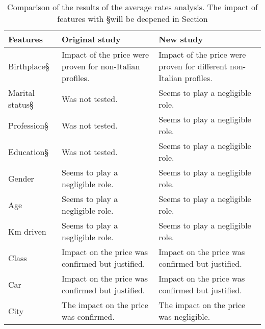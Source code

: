 \begin{table}[!h]
\caption{Comparison of the results of the average rates analysis. The impact of features with \S will be deepened in Section }
\label{tab_average-comparison}
\begin{tabular}{|l|p{6cm}|p{6cm}|}
\hline
\textbf{Features} & \textbf{Original study} & \textbf{New study} \\ \hline
Birthplace\S & Impact of the price were proven for non-Italian profiles. & Impact of the price were proven for different non-Italian profiles. \\ \hline
Marital status\S & Was not tested. & Seems to play a negligible role. \\ \hline
Profession\S & Was not tested. & Seems to play a negligible role. \\ \hline
Education\S & Was not tested. & Seems to play a negligible role. \\ \hline
Gender & Seems to play a negligible role. & Seems to play a negligible role. \\ \hline
Age & Seems to play a negligible role. & Seems to play a negligible role. \\ \hline
Km driven & Seems to play a negligible role. & Seems to play a negligible role. \\ \hline
Class & Impact on the price was confirmed but justified. & Impact on the price was confirmed but justified. \\ \hline
Car & Impact on the price was confirmed but justified. & Impact on the price was confirmed but justified. \\ \hline
City & The impact on the price was confirmed. & The impact on the price was negligible. \\ \hline
\end{tabular}
\end{table}